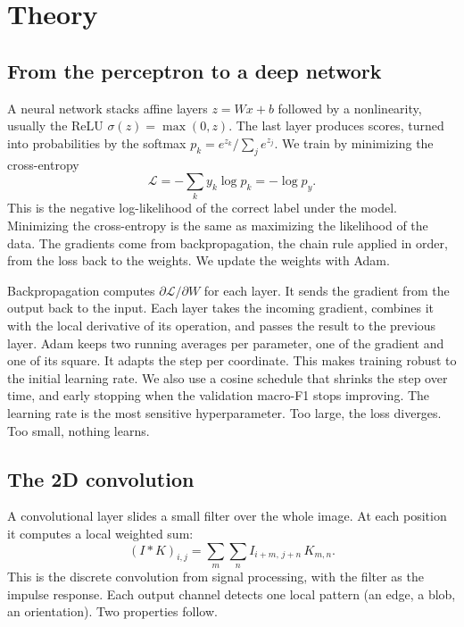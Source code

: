 \documentclass[11pt,a4paper]{article}
\begin{document}
\section{Theory}

\subsection{From the perceptron to a deep network}

A neural network stacks affine layers $z = Wx + b$ followed by a nonlinearity, usually the
ReLU $\sigma(z)=\max(0,z)$. The last layer produces scores, turned into probabilities by the
softmax $p_k = e^{z_k} / \sum_j e^{z_j}$. We train by minimizing the cross-entropy
\begin{equation}
\mathcal{L} = -\sum_{k} y_k \log p_k = -\log p_{y}.
\end{equation}
This is the negative log-likelihood of the correct label under the model. Minimizing the
cross-entropy is the same as maximizing the likelihood of the data. The gradients come from
backpropagation, the chain rule applied in order, from the loss back to the weights. We update
the weights with Adam.

Backpropagation computes $\partial\mathcal{L}/\partial W$ for each layer. It sends the
gradient from the output back to the input. Each layer takes the incoming gradient, combines
it with the local derivative of its operation, and passes the result to the previous layer.
Adam keeps two running averages per parameter, one of the gradient and one of its square. It
adapts the step per coordinate. This makes training robust to the initial learning rate. We
also use a cosine schedule that shrinks the step over time, and early stopping when the
validation macro-F1 stops improving. The learning rate is the most sensitive
hyperparameter. Too large, the loss diverges. Too small, nothing learns.

\subsection{The 2D convolution}

A convolutional layer slides a small filter over the whole image. At each position it
computes a local weighted sum:
\begin{equation}
(I * K)_{i,j} = \sum_{m}\sum_{n} I_{i+m,\,j+n}\, K_{m,n}.
\end{equation}
This is the discrete convolution from signal processing, with the filter as the impulse
response. Each output channel detects one local pattern (an edge, a blob, an orientation).
Two properties follow.
\end{document}
